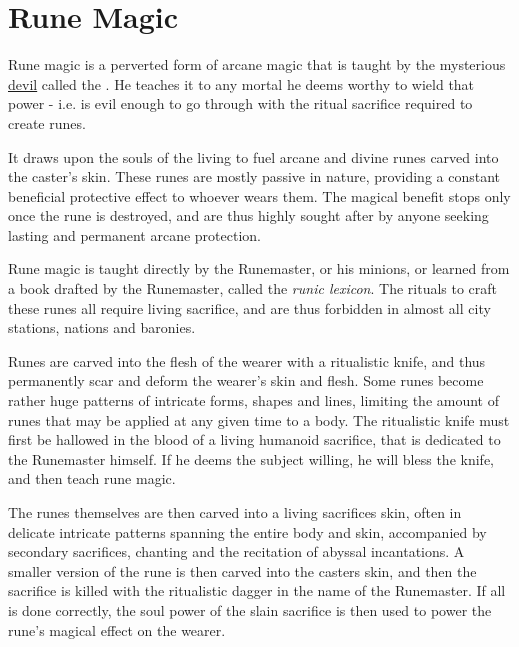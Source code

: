\section{Rune Magic}
\label{sec:Rune Magic}

Rune magic is a perverted form of arcane magic that is taught by the mysterious
\hyperref[sec:Devils]{devil} called the . He teaches it
to any mortal he deems worthy to wield that power - i.e. is evil enough to go
through with the ritual sacrifice required to create runes.

It draws upon the souls of the living to fuel arcane and divine runes carved
into the caster's skin. These runes are mostly passive in nature, providing a
constant beneficial protective effect to whoever wears them. The magical
benefit stops only once the rune is destroyed, and are thus highly sought
after by anyone seeking lasting and permanent arcane protection.

Rune magic is taught directly by the Runemaster, or his minions, or learned
from a book drafted by the Runemaster, called the \emph{runic lexicon}. The
rituals to craft these runes all require living sacrifice, and are thus
forbidden in almost all city stations, nations and baronies.

Runes are carved into the flesh of the wearer with a ritualistic knife, and
thus permanently scar and deform the wearer's skin and flesh. Some runes
become rather huge patterns of intricate forms, shapes and lines, limiting the
amount of runes that may be applied at any given time to a body. The
ritualistic knife must first be hallowed in the blood of a living humanoid
sacrifice, that is dedicated to the Runemaster himself. If he deems the
subject willing, he will bless the knife, and then teach rune magic.



The runes themselves are then carved into a living sacrifices skin, often in
delicate intricate patterns spanning the entire body and skin, accompanied by
secondary sacrifices, chanting and the recitation of abyssal incantations. A
smaller version of the rune is then carved into the casters skin, and then the
sacrifice is killed with the ritualistic dagger in the name of the
Runemaster. If all is done correctly, the soul power of the slain sacrifice is
then used to power the rune's magical effect on the wearer.

